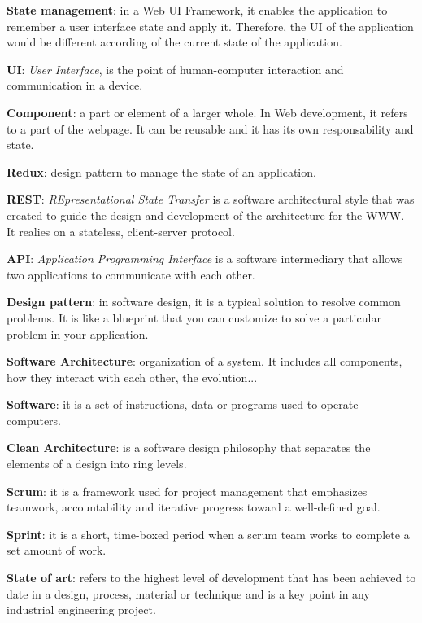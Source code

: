\textbf{State management}: in a Web UI Framework, it enables the application to remember a user interface state and apply it. Therefore, the UI of the application would be different according of the current state of the application.
\bigskip

\textbf{UI}: \textit{User Interface}, is the point of human-computer interaction and communication in a device.
\bigskip

\textbf{Component}: a part or element of a larger whole. In Web development, it refers to a part of the webpage. It can be reusable and it has its own responsability and state.
\bigskip

\textbf{Redux}: design pattern to manage the state of an application. 
\bigskip

\textbf{REST}: \textit{REpresentational State Transfer} is a software architectural style that was created to guide the design and development of the architecture for the WWW. It realies on a stateless, client-server protocol.
\bigskip

\textbf{API}: \textit{Application Programming Interface} is a software intermediary that allows two applications to communicate with each other.
\bigskip

\textbf{Design pattern}: in software design, it is a typical solution to resolve common problems. It is like a blueprint that you can customize to solve a particular problem in your application.
\bigskip

\textbf{Software Architecture}: organization of a system. It includes all components, how they interact with each other, the evolution...
\bigskip

\textbf{Software}: it is a set of instructions, data or programs used to operate computers.
\bigskip

\textbf{Clean Architecture}: is a software design philosophy that separates the elements of a design into ring levels.
\bigskip

\textbf{Scrum}: it is a framework used for project management that emphasizes teamwork, accountability and iterative progress toward a well-defined goal.
\bigskip

\textbf{Sprint}: it is a short, time-boxed period when a scrum team works to complete a set amount of work.
\bigskip

\textbf{State of art}: refers to the highest level of development that has been achieved to date in a design, process, material or technique and is a key point in any industrial engineering project.
\bigskip

